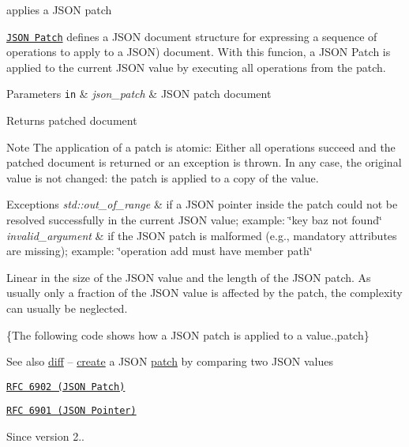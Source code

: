 applies a J\+S\+O\+N patch 

\href{http://jsonpatch.com}{\tt J\+S\+O\+N Patch} defines a J\+S\+O\+N document structure for expressing a sequence of operations to apply to a J\+S\+O\+N) document. With this funcion, a J\+S\+O\+N Patch is applied to the current J\+S\+O\+N value by executing all operations from the patch.


\begin{DoxyParams}[1]{Parameters}
\mbox{\tt in}  & {\em json\+\_\+patch} & J\+S\+O\+N patch document \\
\hline
\end{DoxyParams}
\begin{DoxyReturn}{Returns}
patched document
\end{DoxyReturn}
\begin{DoxyNote}{Note}
The application of a patch is atomic\+: Either all operations succeed and the patched document is returned or an exception is thrown. In any case, the original value is not changed\+: the patch is applied to a copy of the value.
\end{DoxyNote}

\begin{DoxyExceptions}{Exceptions}
{\em std\+::out\+\_\+of\+\_\+range} & if a J\+S\+O\+N pointer inside the patch could not be resolved successfully in the current J\+S\+O\+N value; example\+: {\ttfamily \char`\"{}key baz
not found\char`\"{}} \\
\hline
{\em invalid\+\_\+argument} & if the J\+S\+O\+N patch is malformed (e.\+g., mandatory attributes are missing); example\+: {\ttfamily \char`\"{}operation add must have member path\char`\"{}}\\
\hline
\end{DoxyExceptions}
Linear in the size of the J\+S\+O\+N value and the length of the J\+S\+O\+N patch. As usually only a fraction of the J\+S\+O\+N value is affected by the patch, the complexity can usually be neglected.

\{The following code shows how a J\+S\+O\+N patch is applied to a value.,patch\}

\begin{DoxySeeAlso}{See also}
\hyperlink{classnlohmann_1_1basic__json_a5ef1934868b90452a4a34695489c60cd}{diff} -- \hyperlink{classnlohmann_1_1basic__json_a27df4303fbc83071275074486b54a40e}{create} a J\+S\+O\+N \hyperlink{classnlohmann_1_1basic__json_aa41e1083435cf317a253947eb1ff318d}{patch} by comparing two J\+S\+O\+N values

\href{https://tools.ietf.org/html/rfc6902}{\tt R\+F\+C 6902 (J\+S\+O\+N Patch)} 

\href{https://tools.ietf.org/html/rfc6901}{\tt R\+F\+C 6901 (J\+S\+O\+N Pointer)}
\end{DoxySeeAlso}
\begin{DoxySince}{Since}
version 2.. 
\end{DoxySince}


